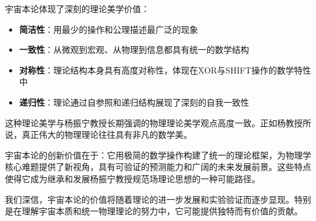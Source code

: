 宇宙本论体现了深刻的理论美学价值：

\begin{itemize}
  \item \textbf{简洁性}：用最少的操作和公理描述最广泛的现象
  \item \textbf{一致性}：从微观到宏观、从物理到信息都具有统一的数学结构
  \item \textbf{对称性}：理论结构本身具有高度对称性，体现在XOR与SHIFT操作的数学特性中
  \item \textbf{递归性}：理论通过自参照和递归结构展现了深刻的自我一致性
\end{itemize}

这种理论美学与杨振宁教授长期强调的物理理论美学观点高度一致。正如杨教授所说，真正伟大的物理理论往往具有非凡的数学美。

宇宙本论的创新价值在于：它用极简的数学操作构建了统一的理论框架，为物理学核心难题提供了新视角，具有可验证的预测能力和广阔的未来发展前景。这些特点使得它成为继承和发展杨振宁教授规范场理论思想的一种可能路径。

我们深信，宇宙本论的价值将随着理论的进一步发展和实验验证而逐步显现。特别是在理解宇宙本质和统一物理理论的努力中，它可能提供独特而有价值的贡献。 